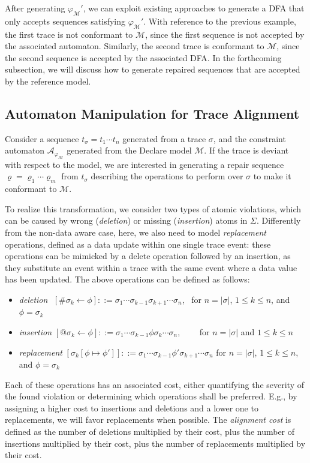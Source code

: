 After generating $\varphi_{\mathcal{M}}'$, we can exploit existing approaches \cite{Westergaard11} to generate a DFA that only accepts sequences satisfying $\varphi_{\mathcal{M}}'$. With reference to the previous example, the first trace is not conformant to $\mathcal{M}$, since the first sequence is not accepted by the associated automaton. Similarly, the second trace is conformant to $\mathcal{M}$, since the second sequence is accepted by the associated DFA. In the forthcoming subsection, we will discuss how to generate repaired sequences that are accepted by the reference model.

\subsection{Automaton Manipulation for Trace Alignment}\label{ssec:amfta}
Consider a sequence $t_\sigma=t_1\cdots t_n$ generated from a trace $\sigma$, and the constraint automaton $\mathcal{A}_{\varphi_{\mathcal{M}}}$ generated from the Declare model $\mathcal{M}$. If the trace is deviant with respect to the model, we are interested in generating a repair sequence $\varrho=\varrho_1\cdots \varrho_m$ from $t_\sigma$ describing the operations to perform over $\sigma$ to make it conformant to $\mathcal{M}$.

To realize this transformation, we consider two types of atomic violations, which can be caused by wrong (\textit{deletion}) or missing (\textit{insertion}) atoms in $\Sigma$. Differently from the non-data aware case, here, we also need to model \textit{replacement} operations, defined as a data update within one single trace event: these operations can be mimicked by a delete operation followed by an insertion, as they substitute an event within a trace with the same event where a data value has been updated. The above operations can be defined as follows:
\begin{itemize}
	\item \textit{deletion}\,\, $[\#\sigma_k\leftarrow \phi]::= \sigma_1\cdots\sigma_{k-1}\sigma_{k+1}\cdots \sigma_n$,\,\,\, for $n=|\sigma|$, $1\leq k\leq n$, and $\phi=\sigma_k$
	\item \textit{insertion} $[@\sigma_k\leftarrow \phi]::= \sigma_1\cdots\sigma_{k-1}\phi\sigma_{k}\cdots \sigma_n$,\,\,\,\,\,\,\,\,\,\,\,\, for $n=|\sigma|$ and $1\leq k\leq n$
	\item \textit{replacement} $[\sigma_k[\phi\mapsto\phi']]::=\sigma_1\cdots \sigma_{k-1}\phi'\sigma_{k+1}\cdots\sigma_n$ for $n=|\sigma|$, $1\leq k\leq n$, and $\phi=\sigma_k$
\end{itemize}
Each of these operations has an associated cost, either quantifying the severity of the found violation or determining which operations shall be preferred. E.g., by assigning a higher cost to insertions and deletions and a lower one to replacements, we will favor replacements when possible. The \textit{alignment cost} is defined as the number of deletions multiplied by their cost, plus the number of insertions multiplied by their cost, plus the number of replacements multiplied by their cost.

